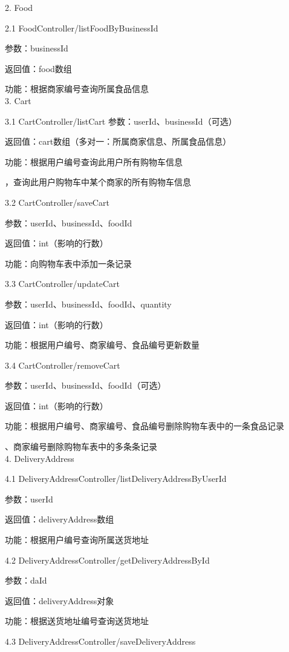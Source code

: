 2. Food

2.1 FoodController/listFoodByBusinessId 

参数：businessId 

返回值：food数组

功能：根据商家编号查询所属食品信息~\\

3. Cart

3.1 CartController/listCart 
参数：userId、businessId（可选）

返回值：cart数组（多对一：所属商家信息、所属食品信息）

功能：根据用户编号查询此用户所有购物车信息

\qquad{}，查询此用户购物车中某个商家的所有购物车信息

3.2 CartController/saveCart 

参数：userId、businessId、foodId 

返回值：int（影响的行数）

功能：向购物车表中添加一条记录

3.3 CartController/updateCart 

参数：userId、businessId、foodId、quantity

返回值：int（影响的行数）

功能：根据用户编号、商家编号、食品编号更新数量

3.4 CartController/removeCart 

参数：userId、businessId、foodId（可选）

返回值：int（影响的行数）

功能：根据用户编号、商家编号、食品编号删除购物车表中的一条食品记录

\qquad{}、商家编号删除购物车表中的多条条记录~\\

4. DeliveryAddress

4.1 DeliveryAddressController/listDeliveryAddressByUserId 

参数：userId 

返回值：deliveryAddress数组

功能：根据用户编号查询所属送货地址

4.2 DeliveryAddressController/getDeliveryAddressById 

参数：daId 

返回值：deliveryAddress对象

功能：根据送货地址编号查询送货地址

4.3 DeliveryAddressController/saveDeliveryAddress 

